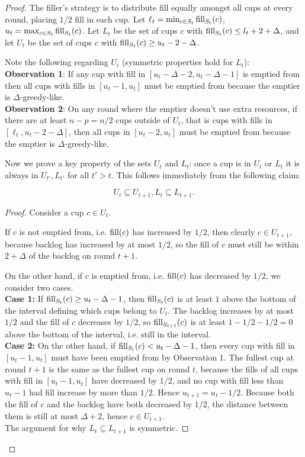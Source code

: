 \begin{proof}
  The filler's strategy is to distribute fill equally amongst all
  cups at every round, placing $1/2$ fill in each cup.
  Let $\ell_t = \min_{c\in S_t} \operatorname{\text{fill}}_{S_t}(c)$, $u_t = \max_{c\in S_t} \operatorname{\text{fill}}_{S_t}(c)$. 
  Let $L_t$ be the set of cups $c$ with $\operatorname{\text{fill}}_{S_t}(c) \le l_t+2+\Delta$, and let
  $U_t$ be the set of cups $c$ with $\operatorname{\text{fill}}_{S_t}(c) \ge u_t-2-\Delta$.
  
  Note the following regarding $U_t$ (symmetric properties hold for $L_t$):\\
  \textbf{Observation 1}: If any cup with fill in $[u_t-\Delta-2,
  u_t-\Delta-1]$ is emptied from then all cups with fills in
  $[u_t-1, u_t]$ must be emptied from because the emptier is
  $\Delta$-greedy-like. \\
  \textbf{Observation 2}:
  On any round where the emptier doesn't use extra resources, if
  there are at least $n-p = n/2$ cups outside of $U_t$, that is cups
  with fills in $[\ell_t, u_t-2-\Delta]$, then all cups in
  $[u_t-2, u_t]$ must be emptied from because the emptier is
  $\Delta$-greedy-like.

  Now we prove a key property of the sets $U_t$ and $L_t$: once a cup is in
  $U_t$ or $L_t$ it is always in $U_{t'}, L_{t'}$ for all $t' > t$. This
  follows immediately from the following claim:
  \begin{clm}
    \label{clm:dontlosestuff}
    $$U_{t} \subseteq U_{t+1}, L_t \subseteq L_{t+1}.$$
  \end{clm}
  \begin{proof}
    Consider a cup $c\in U_t$.

    If $c$ is not emptied from, i.e. $\operatorname{\text{fill}}(c)$ has increased by $1/2$, then
    clearly $c \in U_{t+1}$, because backlog has increased by at most $1/2$, so
    the fill of $c$ must still be within $2+\Delta$ of the backlog on round $t+1$. 

    On the other hand, if $c$ is emptied from, i.e. $\operatorname{\text{fill}}(c)$ has decreased by
    $1/2$, we consider two cases.\\
    \textbf{Case 1:} If $\operatorname{\text{fill}}_{S_t}(c) \ge u_t-\Delta -1$, then
    $\operatorname{\text{fill}}_{S_t}(c)$ is at least $1$ above the bottom of the
    interval defining which cups belong to $U_t$. The backlog
    increases by at most $1/2$ and the fill of $c$ decreases by $1/2$, so
    $\operatorname{\text{fill}}_{S_{t+1}}(c)$ is at least $1-1/2-1/2 = 0$ above the bottom of the
    interval, i.e. still in the interval. \\
    \textbf{Case 2:} On the other hand, if $\operatorname{\text{fill}}_{S_t}(c) <
    u_t-\Delta-1$, then every cup with fill in $[u_t-1, u_t]$
    must have been emptied from by Observation 1. The fullest cup
    at round $t+1$ is the same as the fullest cup on round $t$,
    because the fills of all cups with fill in $[u_t-1, u_t]$
    have decreased by $1/2$, and no cup with fill less than
    $u_t-1$ had fill increase by more than $1/2$. Hence $u_{t+1}
    = u_t -1/2$. Because both the fill of $c$ and the backlog
    have both decreased by $1/2$, the distance between them is
    still at most $\Delta+2$, hence $c\in U_{t+1}$.\\
    The argument for why $L_t \subseteq L_{t+1}$ is symmetric.
  \end{proof}


\end{proof}
